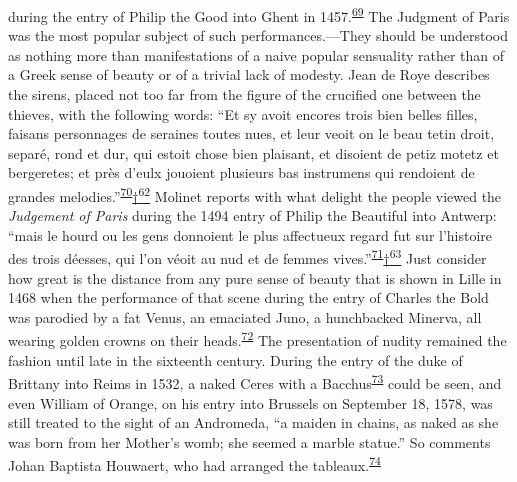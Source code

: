 during the entry of Philip the Good into Ghent in
1457.\textsuperscript{\protect\hypertarget{21_Chapter_Thirteen__IMAGE_AND_WORD.xhtmlux5cux23id_174}{\protect\hyperlink{23_NOTES.xhtmlux5cux23id_175}{69}}}
The Judgment of Paris was the most popular subject of such
performances.---They should be understood as nothing more than
manifestations of a naive popular sensuality rather than of a Greek
sense of beauty or of a trivial lack of modesty. Jean de Roye describes
the sirens, placed not too far from the figure of the crucified one
between the thieves, with the following words: ``Et sy avoit encores
trois bien belles filles, faisans personnages de seraines toutes nues,
et leur veoit on le beau tetin droit, separé, rond et dur, qui estoit
chose bien plaisant, et disoient de petiz motetz et bergeretes; et près
d'eulx jouoient plusieurs bas instrumens qui rendoient de grandes
melodies.''\textsuperscript{\protect\hypertarget{21_Chapter_Thirteen__IMAGE_AND_WORD.xhtmlux5cux23id_172}{\protect\hyperlink{23_NOTES.xhtmlux5cux23id_173}{70}}}\protect\hypertarget{21_Chapter_Thirteen__IMAGE_AND_WORD.xhtmlux5cux23id_2829}{\protect\hyperlink{23_NOTES.xhtmlux5cux23id_2830}{†\textsuperscript{62}}}
Molinet reports with what delight the people viewed the \emph{Judgement
of Paris} during the 1494 entry of Philip the Beautiful into Antwerp:
``mais le hourd ou les gens donnoient le plus affectueux regard fut sur
l'histoire des trois déesses, qui l'on véoit au nud et de femmes
vives.''\textsuperscript{\protect\hypertarget{21_Chapter_Thirteen__IMAGE_AND_WORD.xhtmlux5cux23id_170}{\protect\hyperlink{23_NOTES.xhtmlux5cux23id_171}{71}}}\protect\hypertarget{21_Chapter_Thirteen__IMAGE_AND_WORD.xhtmlux5cux23id_2827}{\protect\hyperlink{23_NOTES.xhtmlux5cux23id_2828}{†\textsuperscript{63}}}
Just consider how great is the distance from any pure sense of beauty
that is shown in Lille in 1468 when the performance of that scene during
the entry of Charles the Bold was parodied by a fat Venus, an emaciated
Juno, a hunchbacked Minerva, all wearing golden crowns on their
heads.\textsuperscript{\protect\hypertarget{21_Chapter_Thirteen__IMAGE_AND_WORD.xhtmlux5cux23id_168}{\protect\hyperlink{23_NOTES.xhtmlux5cux23id_169}{72}}}
The presentation of nudity remained the fashion until late in the
sixteenth century. During the entry of the
\protect\hypertarget{21_Chapter_Thirteen__IMAGE_AND_WORD.xhtmlux5cux23page_375}{}{}duke
of Brittany into Reims in 1532, a naked Ceres with a
Bacchus\textsuperscript{\protect\hypertarget{21_Chapter_Thirteen__IMAGE_AND_WORD.xhtmlux5cux23id_166}{\protect\hyperlink{23_NOTES.xhtmlux5cux23id_167}{73}}}
could be seen, and even William of Orange, on his entry into Brussels on
September 18, 1578, was still treated to the sight of an Andromeda, ``a
maiden in chains, as naked as she was born from her Mother's womb; she
seemed a marble statue.'' So comments Johan Baptista Houwaert, who had
arranged the
tableaux.\textsuperscript{\protect\hypertarget{21_Chapter_Thirteen__IMAGE_AND_WORD.xhtmlux5cux23id_164}{\protect\hyperlink{23_NOTES.xhtmlux5cux23id_165}{74}}}

